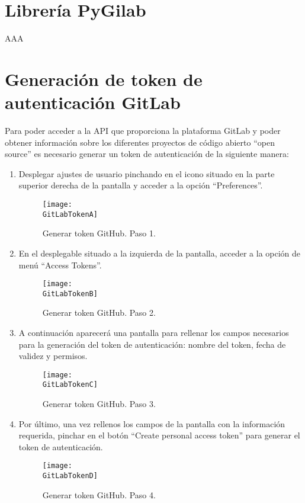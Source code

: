 \section{Librería PyGilab}

AAA

\section{Generación de token de autenticación GitLab}

Para poder acceder a la API que proporciona la plataforma GitLab y poder obtener información sobre los diferentes proyectos de código abierto ``open source'' es necesario generar un token de autenticación de la siguiente manera:

\begin{enumerate}
    \item Desplegar ajustes de usuario pinchando en el icono situado en la parte superior derecha de la pantalla y acceder a la opción ``Preferences''.

    \begin{figure}[h]
        \centering
        \texttt{[image: \\GitLabTokenA]}
        \caption{Generar token GitHub. Paso 1.}
    \end{figure}

    \item En el desplegable situado a la izquierda de la pantalla, acceder a la opción de menú ``Access Tokens''.

    \begin{figure}[h]
        \centering
        \texttt{[image: \\GitLabTokenB]}
        \caption{Generar token GitHub. Paso 2.}
    \end{figure}

    \item A continuación aparecerá una pantalla para rellenar los campos necesarios para la generación del token de autenticación: nombre del token, fecha de validez y permisos.
    
    \begin{figure}[h]
        \centering
        \texttt{[image: \\GitLabTokenC]}
        \caption{Generar token GitHub. Paso 3.}
    \end{figure}

    \item Por último, una vez rellenos los campos de la pantalla con la información requerida, pinchar en el botón ``Create personal access token'' para generar el token de autenticación.

    \begin{figure}[h]
        \centering
        \texttt{[image: \\GitLabTokenD]}
        \caption{Generar token GitHub. Paso 4.}
    \end{figure}

\end{enumerate}